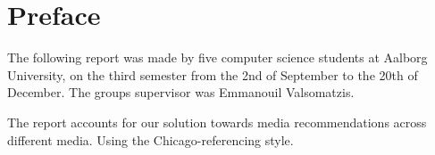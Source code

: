 \chapter*{Preface}
The following report was made by five computer science students at Aalborg University, on the third semester from the 2nd of September to the 20th of December. The groups supervisor was Emmanouil Valsomatzis.


The report accounts for our solution towards media recommendations across different media. Using the Chicago-referencing style.

\null
\vfill
{}